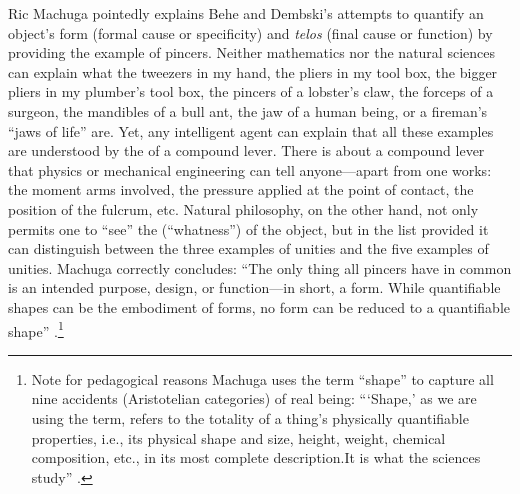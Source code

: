 Ric Machuga pointedly explains Behe and Dembski's attempts to quantify an object's form (formal cause or specificity) and \textit{telos} (final cause or function) by providing the example of pincers. Neither mathematics nor the natural sciences can explain what the tweezers in my hand, the pliers in my tool box, the bigger pliers in my plumber's tool box, the pincers of a lobster's claw, the forceps of a surgeon, the mandibles of a bull ant, the jaw of a human being, or a fireman's ``jaws of life'' are. Yet, any intelligent agent can explain that all these examples are understood by the  of a compound lever. There is  about  a compound lever  that physics or mechanical engineering can tell anyone---apart from  one works: the moment arms involved, the pressure applied at the point of contact, the position of the fulcrum, etc. Natural philosophy, on the other hand, not only permits one to ``see'' the  (``whatness'') of the object, but in the list provided it can distinguish between the three examples of  unities and the five examples of  unities. Machuga correctly concludes: ``The only thing all pincers have in common is an intended purpose, design, or function---in short, a form. While quantifiable shapes can be the embodiment of forms, no form can be reduced to a quantifiable shape'' \cite[p.~162]{machuga}.\footnote{Note for pedagogical reasons Machuga uses the term ``shape'' to capture all nine accidents (Aristotelian categories) of real being: {``}`Shape,' as we are using the term, refers to the totality of a thing's physically quantifiable properties, i.e., its physical shape and size, height, weight, chemical composition, etc., in its most complete description.{\jdots}It is what the sciences study'' \citep[][p.~27]{machuga}.}

